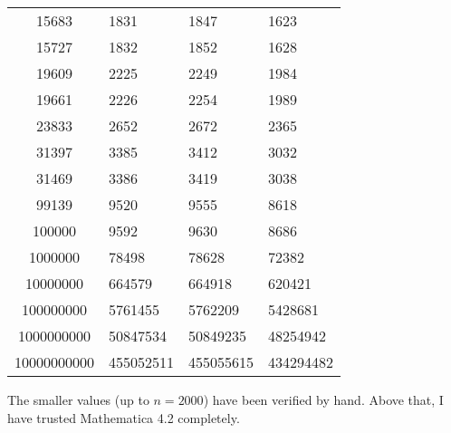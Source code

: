 \documentclass[12pt]{article}
\begin{document}
\begin{tabular}{|c|l|l|l|}
15683 & 1831 & 1847 & 1623 \\
15727 & 1832 & 1852 & 1628 \\
19609 & 2225 & 2249 & 1984 \\
19661 & 2226 & 2254 & 1989 \\
23833 & 2652 & 2672 & 2365 \\
31397 & 3385 & 3412 & 3032 \\
31469 & 3386 & 3419 & 3038 \\
99139 & 9520 & 9555 & 8618 \\
100000 & 9592 & 9630 & 8686 \\
1000000 & 78498 & 78628 & 72382 \\
10000000 & 664579 & 664918 & 620421 \\
100000000 & 5761455 & 5762209 & 5428681 \\
1000000000 & 50847534 & 50849235 & 48254942 \\
10000000000 & 455052511 & 455055615 & 434294482 \\
\end{tabular}

The smaller values (up to $n = 2000$) have been verified by hand. Above that, I have trusted Mathematica 4.2 completely.
\end{document}
